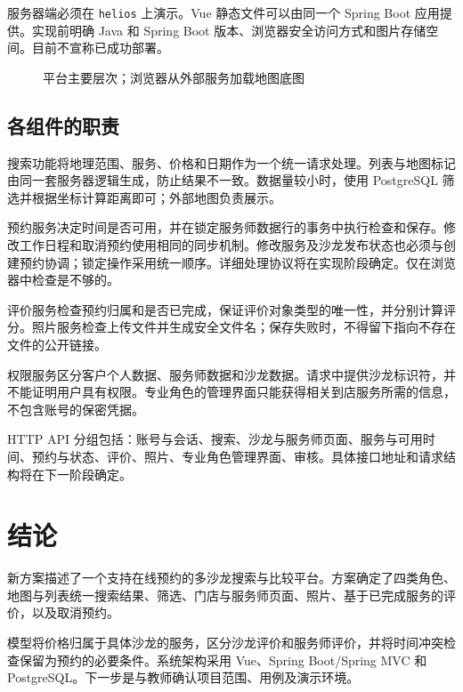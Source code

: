 服务器端必须在 \texttt{helios} 上演示。Vue 静态文件可以由同一个 Spring Boot 应用提供。实现前明确 Java 和 Spring Boot 版本、浏览器安全访问方式和图片存储空间。目前不宣称已成功部署。

\begin{figure}[htbp]
\centering
{}
\caption{平台主要层次；浏览器从外部服务加载地图底图}
\end{figure}

\subsection{各组件的职责}
搜索功能将地理范围、服务、价格和日期作为一个统一请求处理。列表与地图标记由同一套服务器逻辑生成，防止结果不一致。数据量较小时，使用 PostgreSQL 筛选并根据坐标计算距离即可；外部地图负责展示。

预约服务决定时间是否可用，并在锁定服务师数据行的事务中执行检查和保存。修改工作日程和取消预约使用相同的同步机制。修改服务及沙龙发布状态也必须与创建预约协调；锁定操作采用统一顺序。详细处理协议将在实现阶段确定。仅在浏览器中检查是不够的。

评价服务检查预约归属和是否已完成，保证评价对象类型的唯一性，并分别计算评分。照片服务检查上传文件并生成安全文件名；保存失败时，不得留下指向不存在文件的公开链接。

权限服务区分客户个人数据、服务师数据和沙龙数据。请求中提供沙龙标识符，并不能证明用户具有权限。专业角色的管理界面只能获得相关到店服务所需的信息，不包含账号的保密凭据。

HTTP API 分组包括：账号与会话、搜索、沙龙与服务师页面、服务与可用时间、预约与状态、评价、照片、专业角色管理界面、审核。具体接口地址和请求结构将在下一阶段确定。

\section{结论}
新方案描述了一个支持在线预约的多沙龙搜索与比较平台。方案确定了四类角色、地图与列表统一搜索结果、筛选、门店与服务师页面、照片、基于已完成服务的评价，以及取消预约。

模型将价格归属于具体沙龙的服务，区分沙龙评价和服务师评价，并将时间冲突检查保留为预约的必要条件。系统架构采用 Vue、Spring Boot/Spring MVC 和 PostgreSQL。下一步是与教师确认项目范围、用例及演示环境。

